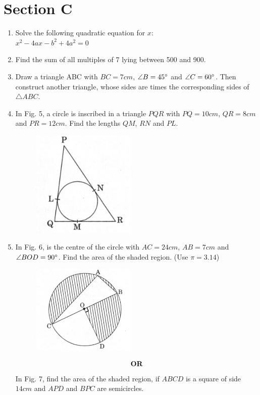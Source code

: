 \documentclass[journal,12pt,twocolumn]{IEEEtran}
\renewcommand\thesection{\arabic{section}}
\begin{document}
\section{Section C}
\renewcommand{\theequation}{\theenumi}
\begin{enumerate}[label=\thesection.\arabic*.,ref=\thesection.\theenumi]
\item Solve the following quadratic equation for $x:$ \\
$x^2-4ax-b^2+4a^2=0$\\
\item Find the sum of all multiples of 7 lying between 500 and 900. \\
\item Draw a triangle ABC with $BC = 7cm$, $\angle B = 45\degree$ and $\angle C = 60\degree$. Then construct another triangle, whose sides are times the corresponding sides of  $\triangle ABC.$ \\
\item In Fig. 5, a circle is inscribed in a triangle $PQR$ with $PQ = 10cm$, $QR = 8cm$ and $PR = 12cm$. Find the lengths $QM$, $RN$ and $PL$.\\

\begin{figure}[h!]
    \centering
    \includegraphics[width=5cm]{5.png}
 \end{figure}
\label{fig5}
\item In Fig. 6, is the centre of the circle with $AC = 24cm$, $AB=7cm$ and $\angle BOD = 90\degree$. Find the area of the shaded region. (Use $\pi = 3.14$)\\

\begin{figure}[h!]
    \centering
    \includegraphics[width=5cm]{6.png}
 \end{figure}
\begin{align}
    \centering \vec{OR}\nonumber
\end{align}
In Fig. 7, find the area of the shaded region, if $ABCD$ is a square of side $14 cm$ and $APD$ and $BPC$ are semicircles.\\


\end{enumerate}
\end{document}
